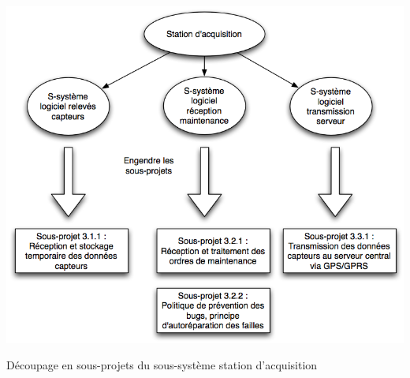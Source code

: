 \begin {center}
\includegraphics[width=\textwidth]{png/ss3Station.png}
\caption{Découpage en sous-projets du sous-système station d'acquisition}
\end {center}

